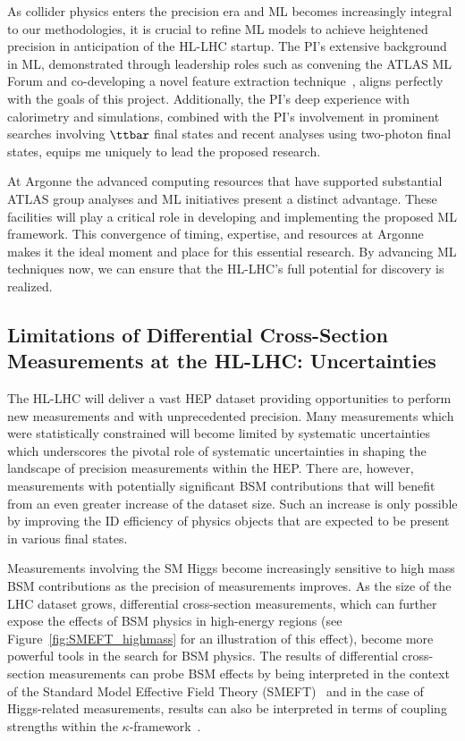 \documentclass[letter, USenglish, 11pt, subfigure]{article}
\begin{document}
As collider physics enters the precision era and ML becomes increasingly integral to our methodologies, it is crucial to refine ML models to achieve heightened precision in anticipation of the HL-LHC startup. The PI's extensive background in ML, demonstrated through leadership roles such as convening the ATLAS ML Forum and co-developing a novel feature extraction technique~\cite{dijetAnom}, aligns perfectly with the goals of this project. Additionally, the PI's deep experience with calorimetry and simulations, combined with the PI's involvement in prominent searches involving $\ttbar$ final states and recent analyses using two-photon final states, equips me uniquely to lead the proposed research.

At Argonne the advanced computing resources that have supported substantial ATLAS group analyses and ML initiatives present a distinct advantage. These facilities will play a critical role in developing and implementing the proposed ML framework. This convergence of timing, expertise, and resources at Argonne makes it the ideal moment and place for this essential research. By advancing ML techniques now, we can ensure that the HL-LHC's full potential for discovery is realized.

\clearpage

\subsection{Limitations of Differential Cross-Section Measurements at the HL-LHC: Uncertainties}
The HL-LHC will deliver a vast HEP dataset providing opportunities to perform new measurements and with unprecedented precision.
Many measurements which were statistically constrained will become limited by systematic uncertainties which underscores the pivotal role of systematic uncertainties in shaping the landscape of precision measurements within the HEP. There are, however, measurements with potentially significant BSM contributions that will benefit from an even greater increase of the dataset size. Such an increase is only possible by improving the ID efficiency of physics objects that are expected to be present in various final states. 

Measurements involving the SM Higgs become increasingly sensitive to high mass BSM contributions as the precision of measurements improves. As the size of the LHC dataset grows, differential cross-section measurements, which can further expose the effects of BSM physics in high-energy regions (see Figure~\ref{fig:SMEFT_highmass} for an illustration of this effect), become more powerful tools in the search for BSM physics. The results of differential cross-section measurements can probe BSM effects by being interpreted in the context of the Standard Model Effective Field Theory (SMEFT)~\cite{Buchmuller:1985jz,Grzadkowski:2010es,SMEFTsim3} and in the case of Higgs-related measurements, results can also be interpreted in terms of coupling strengths within the $\kappa$-framework~\cite{deFlorian:2016spz}.
\end{document}
